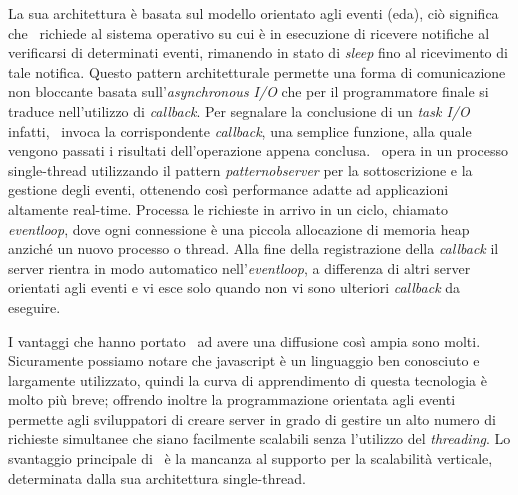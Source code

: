 La sua architettura è basata sul modello orientato agli eventi (\acrshort{eda}), ciò significa che \nodejs~richiede al sistema operativo su cui è in esecuzione di ricevere notifiche al verificarsi di determinati eventi, rimanendo in stato di \textit{sleep} fino al ricevimento di tale notifica. Questo pattern architetturale permette una forma di comunicazione non bloccante basata sull'\textit{asynchronous I/O} che per il programmatore finale si traduce nell'utilizzo di \textit{\gls{callback}}. Per segnalare la conclusione di un \textit{task I/O} infatti, \nodejs~invoca la corrispondente \textit{\gls{callback}}, una semplice funzione, alla quale vengono passati i risultati dell'operazione appena conclusa.
\nodejs~opera in un processo single-thread utilizzando il pattern \textit{\acrshort{patternobserver}} per la sottoscrizione e la gestione degli eventi, ottenendo così performance adatte ad applicazioni altamente real-time. Processa le richieste in arrivo in un ciclo, chiamato \textit{\gls{eventloop}}, dove ogni connessione è una piccola allocazione di memoria heap anziché un nuovo processo o thread. Alla fine della registrazione della \textit{\gls{callback}} il server rientra in modo automatico nell'\textit{\gls{eventloop}}, a differenza di altri server orientati agli eventi e vi esce solo quando non vi sono ulteriori \textit{\gls{callback}} da eseguire.

I vantaggi che hanno portato \nodejs~ad avere una diffusione così ampia sono molti. Sicuramente possiamo notare che \gls{javascript} è un linguaggio ben conosciuto e largamente utilizzato, quindi la curva di apprendimento di questa tecnologia è molto più breve; offrendo inoltre la programmazione orientata agli eventi permette agli sviluppatori di creare server in grado di gestire un alto numero di richieste simultanee che siano facilmente scalabili senza l'utilizzo del \textit{threading}. Lo svantaggio principale di \nodejs~è la mancanza al supporto per la scalabilità verticale, determinata dalla sua architettura single-thread.

